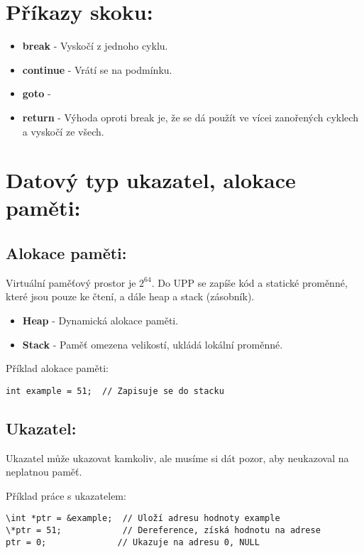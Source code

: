 \documentclass{article}
\begin{document}
\section*{Příkazy skoku:}
\begin{itemize}[noitemsep] %
    \item \textbf{break} - Vyskočí z jednoho cyklu.
    \item \textbf{continue} - Vrátí se na podmínku.
    \item \textbf{goto} -
    \item \textbf{return} - Výhoda oproti break je, že se dá použít ve vícei
        zanořených cyklech a vyskočí ze všech.
\end{itemize}

\section*{Datový typ ukazatel, alokace paměti:}

\subsection*{Alokace paměti:}
Virtuální paměťový prostor je $2^{64}$. Do UPP se zapíše kód a statické proměnné,
které jsou pouze ke čtení, a dále heap a stack (zásobník).

\begin{itemize}[noitemsep]
    \item \textbf{Heap} - Dynamická alokace paměti.
    \item \textbf{Stack} - Paměť omezena velikostí, ukládá lokální proměnné.
\end{itemize}

Příklad alokace paměti:
\begin{lstlisting}
int example = 51;  // Zapisuje se do stacku
\end{lstlisting}

\subsection*{Ukazatel:}
Ukazatel může ukazovat kamkoliv, ale musíme si dát pozor, aby neukazoval na neplatnou paměť.

Příklad práce s ukazatelem:
\begin{lstlisting}
\int *ptr = &example;  // Uloží adresu hodnoty example
\*ptr = 51;            // Dereference, získá hodnotu na adrese
ptr = 0;              // Ukazuje na adresu 0, NULL
\end{lstlisting}
\end{document}
